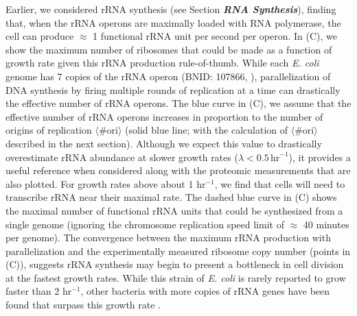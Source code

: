 Earlier, we considered rRNA synthesis (see Section \textit{\bf RNA Synthesis}),
finding that, when the rRNA operons are maximally loaded with RNA polymerase,
the cell can produce $\approx$ 1 functional rRNA unit per second per operon. In
(C), we show the maximum number of ribosomes that could be
made as a function of growth rate given this rRNA production rule-of-thumb.
While each \textit{E. coli} genome has 7 copies of the rRNA operon (BNID:
107866, \cite{milo2010}), parallelization of DNA synthesis by firing multiple
rounds of replication at a time can drastically the effective number of rRNA
operons. The blue curve in (C), we assume that the effective
number of rRNA operons increases in proportion to the number of origins of
replication $\langle\text{\# ori}\rangle$ (solid blue line; with the calculation
of $\langle\text{\# ori}\rangle$ described in the next section). Although we
expect this value to drastically overestimate rRNA abundance at slower growth
rates ($\lambda < 0.5\, \text{hr}^{-1}$), it provides a useful reference when
considered along with the proteomic measurements that are also plotted. For
growth rates above about 1 hr$^{-1}$, we find that cells will need to transcribe
rRNA near their maximal rate.  The dashed blue curve in (C)
shows the maximal number of functional rRNA units that could be synthesized from
a single genome (ignoring the chromosome replication speed limit of $\approx$ 40
minutes per genome). The convergence between the maximum rRNA production with
parallelization and the experimentally measured ribosome copy number (points in
(C)), suggests rRNA synthesis may begin to present a
bottleneck in cell division at the fastest growth rates. While this strain of
\textit{E. coli} is rarely reported to grow faster than 2 hr$^{-1}$, other
bacteria with more copies of rRNA genes have been found that surpass this growth
rate \citep{bremer2008,roller2016}.
